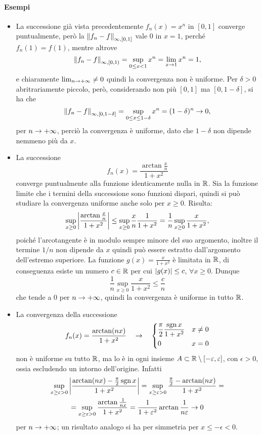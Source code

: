 \paragraph{Esempi}
\begin{itemize}
\item La successione già vista precedentemente $f_n(x)=x^n$ in $[0,1]$ converge puntualmente, però la $\left\|{f_n-f}\right\|_{\infty,[0,1]}$ vale 0 in $x=1$, perché $f_n(1)=f(1)$, mentre altrove
\[
\left\|{f_n-f}\right\|_{\infty,[0,1)}=\sup_{0\leq x<1} x^n=\lim_{x\to 1}x^n=1,
\]
e chiaramente $\lim_{n\to+\infty}\neq 0$ quindi la convergenza non è uniforme. Per $\delta>0$ abritrariamente piccolo, però, considerando non più $[0,1]$ ma $[0,1-\delta]$, si ha che 
\[
\left\|{f_n-f}\right\|_{\infty,[0,1-\delta]}=\sup_{0\leq x\leq 1-\delta} x^n=(1-\delta)^n\to 0,
\]
per $n\to+\infty$, perciò la convergenza è uniforme, dato che $1-\delta$ non dipende nemmeno più da $x$.
\item La successione
\[
f_n(x)=\frac{\arctan\frac{x}{n}}{1+x^2}
\]
converge puntualmente alla funzione identicamente nulla in $\mathbb{R}$. Sia la funzione limite che i termini della successione sono funzioni dispari, quindi si può studiare la convergenza uniforme anche solo per $x\geq 0$. Risulta:
\[
\sup_{x\geq 0}\left|{\frac{\arctan\frac{x}{n}}{1+x^2}}\right|\leq\sup_{x\geq 0}\frac{x}{n}\frac1{1+x^2}=\frac1{n}\sup_{x\geq 0}\frac{x}{1+x^2},
\]
poiché l'arcotangente è in modulo sempre minore del suo argomento, inoltre il termine $1/n$ non dipende da $x$ quindi può essere estratto dall'argomento dell'estremo superiore. La funzione $g(x)=\frac{x}{1+x^2}$ è limitata in $\mathbb{R}$, di conseguenza esiste un numero $c\in\mathbb{R}$ per cui $\left|{g(x)}\right|\leq c$, $\forall x\geq 0$. Dunque
\[
\frac1{n}\sup_{x\geq 0}\frac{x}{1+x^2}\leq\frac{c}{n}
\]
che tende a 0 per $n\to+\infty$, quindi la convergenza è uniforme in tutto $\mathbb{R}$.
\item La convergenza della successione
\[
f_n(x)=\frac{\arctan(nx)}{1+x^2}\quad\to\quad\begin{dcases}\frac{\pi}2\frac{\operatorname{sgn} x}{1+x^2}&x\neq 0\\ 0&x=0\end{dcases}
\]
non è uniforme su tutto $\mathbb{R}$, ma lo è in ogni insieme $A\subset\mathbb{R}\setminus[-\varepsilon,\varepsilon]$, con $\epsilon>0$, ossia escludendo un intorno dell'origine. Infatti
\begin{multline*}
\sup_{x\geq\varepsilon>0}\left|{\frac{\arctan(nx)-\frac{\pi}2\operatorname{sgn} x}{1+x^2}}\right|=\sup_{x\geq\varepsilon>0}\frac{\frac{\pi}2-\arctan(nx)}{1+x^2}=\\
=\sup_{x\geq\varepsilon>0}\frac{\arctan\frac1{nx}}{1+x^2}=\frac1{1+\varepsilon^2}\arctan\frac1{n\varepsilon}\to 0
\end{multline*}
per $n\to+\infty$; un risultato analogo si ha per simmetria per $x\leq -\epsilon<0$.
\end{itemize}

